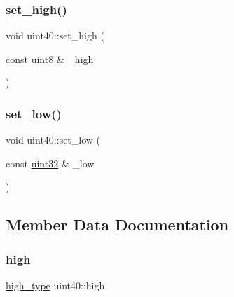 \mbox{\label{classuint40_a4d8e0bfd4cb5f959d89d3966c10a28bc}} 
\subsubsection{\texorpdfstring{set\+\_\+high()}{set\_high()}}
{\footnotesize\ttfamily void uint40\+::set\+\_\+high (\begin{DoxyParamCaption}\item[{const \hyperlink{types_8h_a115946cb5fc5879545e9ccea096a6031}{uint8} \&}]{\+\_\+high }\end{DoxyParamCaption})\hspace{0.3cm}{\ttfamily [inline]}}

\mbox{\label{classuint40_a451e74374aa8f180e94d341e18352d4c}} 
\subsubsection{\texorpdfstring{set\+\_\+low()}{set\_low()}}
{\footnotesize\ttfamily void uint40\+::set\+\_\+low (\begin{DoxyParamCaption}\item[{const \hyperlink{types_8h_a8f95e75e58492e87412191fabadd8ca8}{uint32} \&}]{\+\_\+low }\end{DoxyParamCaption})\hspace{0.3cm}{\ttfamily [inline]}}



\subsection{Member Data Documentation}
\mbox{\label{classuint40_a830b04aa389a4e72c446cc88de38b656}} 
\subsubsection{\texorpdfstring{high}{high}}
{\footnotesize\ttfamily \hyperlink{classuint40_a58afcd6aeb1ea1e103b8e85eb6aefec4}{high\+\_\+type} uint40\+::high\hspace{0.3cm}{\ttfamily [private]}}

